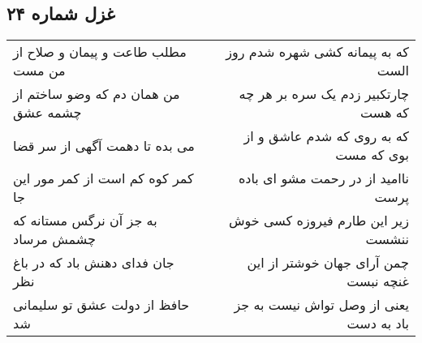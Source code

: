\begin{center}
\section*{غزل شماره ۲۴}
\label{sec:sh024}
\begin{longtable}{l p{0.5cm} r}
مطلب طاعت و پیمان و صلاح از من مست
&&
که به پیمانه کشی شهره شدم روز الست
\\
من همان دم که وضو ساختم از چشمه عشق
&&
چارتکبیر زدم یک سره بر هر چه که هست
\\
می بده تا دهمت آگهی از سر قضا
&&
که به روی که شدم عاشق و از بوی که مست
\\
کمر کوه کم است از کمر مور این جا
&&
ناامید از در رحمت مشو ای باده پرست
\\
به جز آن نرگس مستانه که چشمش مرساد
&&
زیر این طارم فیروزه کسی خوش ننشست
\\
جان فدای دهنش باد که در باغ نظر
&&
چمن آرای جهان خوشتر از این غنچه نبست
\\
حافظ از دولت عشق تو سلیمانی شد
&&
یعنی از وصل تواش نیست به جز باد به دست
\\
\end{longtable}
\end{center}
